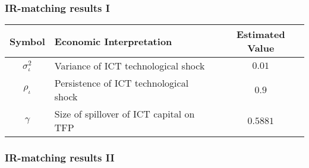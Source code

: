 \documentclass{beamer}
\def \MainFigures{../Draft_Summer2018/MainFigures}
\def\myFigWidth{2.0in}
\begin{document}
\begin{frame}
	\frametitle{IR-matching results I}

	\begin{table}[h!]
	\begin{center}
		\begin{tabular}{clc}
			\hline
			Symbol & Economic Interpretation & Estimated Value \\
			\hline
            $\sigma^2_{\iota}$ & Variance of ICT technological shock &   $0.01$  \\
            $\rho_{\iota}$     & Persistence of ICT technological shock & $0.9$   \\
            $\gamma$           & Size of spillover of ICT capital on TFP &  $0.5881$ \\
			\hline
		\end{tabular}
		\label{table:estimated_parameters}
	\end{center}
\end{table}	

\end{frame}

\begin{frame}
	\frametitle{IR-matching results II}
	
\begin{figure}[h!]
{} \hspace{.2in%
} 
 \hspace{.2in%
} 
 \hspace{.2in%
} 
\end{figure}
\end{frame}
\end{document}
